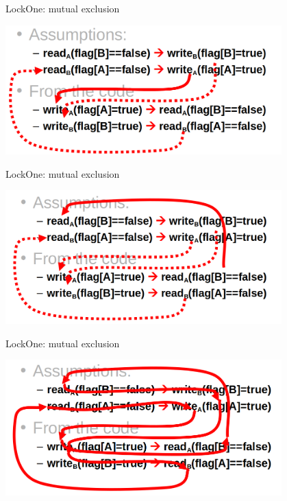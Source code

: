 \begin{frame}{LockOne: mutual exclusion}
\begin{center}
  \includegraphics[width=0.8\textwidth]{./pics/lock1/combine-4.png}
\end{center}
\end{frame}

\begin{frame}{LockOne: mutual exclusion}
\begin{center}
  \includegraphics[width=0.8\textwidth]{./pics/lock1/combine-5.png}
\end{center}
\end{frame}

\begin{frame}{LockOne: mutual exclusion}
\begin{center}
  \includegraphics[width=0.8\textwidth]{./pics/lock1/combine-6.png}
\end{center}
\end{frame}

